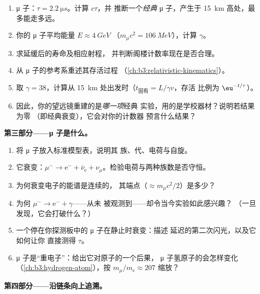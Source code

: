 \begin{problem}
\begin{enumerate}[resume]
  \item μ 子：$\tau = \qty{2.2}{\micro s}$。计算 $c\tau$，并
        推断一个\emph{经典} μ 子，产生于
        \qty{15}{km} 高处，最多能走多远。
  \item 你的 μ 子平均能量 $E \approx \qty{4}{GeV}$
        （$m_\mu c^2 = \qty{106}{MeV}$），计算 $\gamma$。
  \item 求延缓后的寿命及相应射程，
        并判断阁楼计数率现在是否合理。
  \item 从 μ 子的参考系重述其存活过程
        （\cref{ch:b3:relativistic-kinematics}）。
  \item 取 $\gamma = 38$，计算从
        \qty{15}{km} 处出发时（$t_{\text{固有}} = L/\gamma v$，存活
        比例为 $\eu^{-t/\tau}$）。
  \item 因此，你的望远镜重建的是\emph{哪一项}经典
        实验，用的是学校器材？说明若结果为零
        （即经典衰变），它会对你的计数器
        预言什么结果？
\end{enumerate}

\medskip\noindent\textbf{第三部分——μ 子是什么。}

\begin{enumerate}[resume]
  \item 将 μ 子放入标准模型表，说明其
        族、代、电荷与自旋。
  \item 它衰变：$\mu^- \to \text{e}^- + \bar\nu_{\text{e}} +
        \nu_\mu$。检验电荷与两种族数是否守恒。
  \item 为何衰变电子的能谱是连续的，
        其端点（$\approx m_\mu c^2/2$）是多少？
  \item 为何 $\mu^- \to \text{e}^- + \gamma$——从未
        被观测到——却令当今实验如此感兴趣？
        （一旦发现，它会打破什么？）
  \item 一个停在你探测板中的 μ 子在静止时衰变：描述
        延迟的第二次闪光，以及它如何让你
        直接测得 $\tau$。
  \item μ 子是“重电子”：给出它对原子的一个后果，
        μ 子氢原子的会怎样变化
        （\cref{ch:b3:hydrogen-atom}），按
        $m_\mu/m_{\text{e}} \approx 207$ 缩放？
\end{enumerate}

\medskip\noindent\textbf{第四部分——沿链条向上追溯。}


\end{problem}

